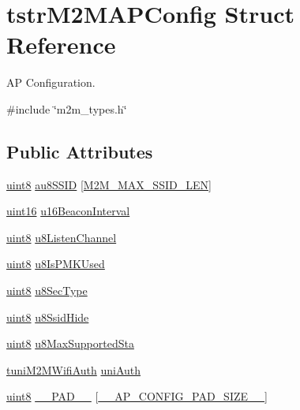 \hypertarget{structtstrM2MAPConfig}{}\section{tstr\+M2\+M\+A\+P\+Config Struct Reference}
\label{structtstrM2MAPConfig}


AP Configuration.  




{\ttfamily \#include \char`\"{}m2m\+\_\+types.\+h\char`\"{}}

\subsection*{Public Attributes}
\begin{DoxyCompactItemize}
\item 
\hyperlink{group__DataT_ga4df709a77647e870bbf1d955b8edc9a6}{uint8} \hyperlink{structtstrM2MAPConfig_a880b8f6aff1114bfb6a6f94b9351920f}{au8\+S\+S\+ID} \mbox{[}\hyperlink{group__WlanDefines_gab2bd95c18ede2fbc07b44c5660cc0097}{M2\+M\+\_\+\+M\+A\+X\+\_\+\+S\+S\+I\+D\+\_\+\+L\+EN}\mbox{]}
\item 
\hyperlink{group__DataT_ga1daa745171fc6e31d942c161422a76f9}{uint16} \hyperlink{structtstrM2MAPConfig_ac28eaca963a1872d2d559813d0224ae5}{u16\+Beacon\+Interval}
\item 
\hyperlink{group__DataT_ga4df709a77647e870bbf1d955b8edc9a6}{uint8} \hyperlink{structtstrM2MAPConfig_a1425d62e5001c25d04d88e20582526e0}{u8\+Listen\+Channel}
\item 
\hyperlink{group__DataT_ga4df709a77647e870bbf1d955b8edc9a6}{uint8} \hyperlink{structtstrM2MAPConfig_ad9d4b9a81cf084af4399fb2aa1817554}{u8\+Is\+P\+M\+K\+Used}
\item 
\hyperlink{group__DataT_ga4df709a77647e870bbf1d955b8edc9a6}{uint8} \hyperlink{structtstrM2MAPConfig_a08ec2faca4058e8627cbfdb20f6a6da5}{u8\+Sec\+Type}
\item 
\hyperlink{group__DataT_ga4df709a77647e870bbf1d955b8edc9a6}{uint8} \hyperlink{structtstrM2MAPConfig_a425c035bc96435d3a9e75082ce27b569}{u8\+Ssid\+Hide}
\item 
\hyperlink{group__DataT_ga4df709a77647e870bbf1d955b8edc9a6}{uint8} \hyperlink{structtstrM2MAPConfig_af83f7b1e0f098c4ba68eb7c8914759f9}{u8\+Max\+Supported\+Sta}
\item 
\hyperlink{uniontuniM2MWifiAuth}{tuni\+M2\+M\+Wifi\+Auth} \hyperlink{structtstrM2MAPConfig_a131f76e7c154d35841cfbaac680e58b8}{uni\+Auth}
\item 
\hyperlink{group__DataT_ga4df709a77647e870bbf1d955b8edc9a6}{uint8} \hyperlink{structtstrM2MAPConfig_a2132fb69b58ed7c32910377ae0ad256d}{\+\_\+\+\_\+\+P\+A\+D\+\_\+\+\_\+} \mbox{[}\hyperlink{m2m__types_8h_ac5299b53de3b245c35f8aa74fa096044}{\+\_\+\+\_\+\+A\+P\+\_\+\+C\+O\+N\+F\+I\+G\+\_\+\+P\+A\+D\+\_\+\+S\+I\+Z\+E\+\_\+\+\_\+}\mbox{]}
\end{DoxyCompactItemize}


